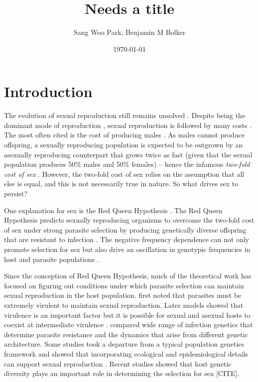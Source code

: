 \documentclass{article}\usepackage[]{graphicx}\usepackage[]{color}
\title{Needs a title}
\author{Sang Woo Park, Benjamin M Bolker}
\date{\today}
\begin{document}
\maketitle

\section{Introduction}

The evolution of sexual reproduction still remains unsolved \citep{otto2009evolutionary}.
Despite being the dominant mode of reproduction \citep{vrijenhoek1998animal}, sexual reproduction is followed by many costs \citep{lehtonen2012many}.
The most often cited is the cost of producing males \citep{smith1978evolution}.
As males cannot produce offspring, a sexually reproducing population is expected to be outgrown by an asexually reproducing counterpart that grows twice as fast (given that the sexual population produces 50\% males and 50\% females) --
hence the infamous \emph{two-fold cost of sex} \citep{smith1978evolution}.
However, the two-fold cost of sex relies on the assumption that all else is equal, and this is not necessarily true in nature.
So what drives sex to persist?

One explanation for sex is the Red Queen Hypothesis \citep{bell1982masterpiece}.
The Red Queen Hypothesis predicts sexually reproducing organisms to overcome the two-fold cost of sex under strong parasite selection by producing genetically diverse offspring that are resistant to infection \citep{jbs1949disease, jaenike1978hypothesis, hamilton1980sex}.
The negative frequency dependence can not only promote selection for sex but also drive an oscillation in genotypic frequencies in host and parasite populations \citep{clarke1976ecological, hamilton1980sex}.

Since the conception of Red Queen Hypothesis, much of the theoretical work has focused on figuring out conditions under which parasite selection can maintain sexual reproduction in the host population.
\cite{may1983epidemiology} first noted that parasites must be extremely virulent to maintain sexual reproduction.
Later models showed that virulence is an important factor but it is possible for sexual and asexual hosts to coexist at intermediate virulence \citep{howard1994parasitism}.
\cite{agrawal2002infection} compared wide range of infection genetics that determine parasite resistance and the dynamics that arise from different genetic architecture.
Some studies took a departure from a typical population genetics framework and showed that incorporating ecological and epidemiological details can support sexual reproduction \citep{galvani2001antigenic, galvani2003maintenance, lively2009maintenance, lively2010epidemiological}.
Recent studies showed that host genetic diversity plays an important role in determining the selection for sex [CITE].
\end{document}
